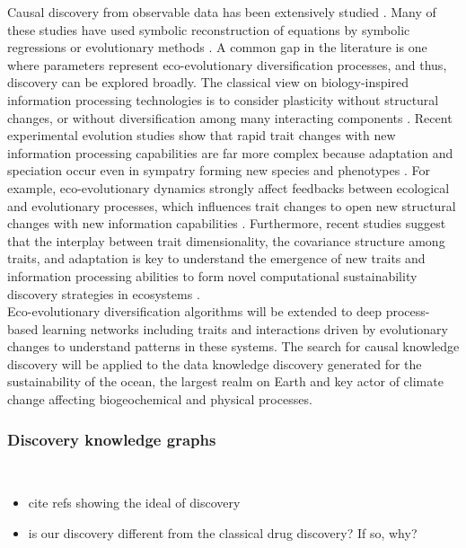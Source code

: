 \documentclass[12pt,a4paper]{article}
\begin{document}
Causal discovery from observable data has been extensively studied \citep{Rackauckas2020}. Many of these studies have used symbolic reconstruction of equations by symbolic regressions or evolutionary methods \citep{Koza1992, quade2016prediction, tanevski2020combinatorial}. A common gap in the literature is one where parameters represent eco-evolutionary diversification processes, and thus, discovery can be explored broadly. The classical view on biology-inspired information processing technologies is to consider plasticity without structural changes, or without diversification among many interacting components \citep{DARWISH2018231}. Recent experimental evolution studies show that rapid trait changes with new information processing capabilities are far more complex because adaptation and speciation occur even in sympatry forming new species and phenotypes \citep{Seehausen2014}. For example, eco-evolutionary dynamics strongly affect feedbacks between ecological and evolutionary processes, which influences trait changes to open new structural changes with new information capabilities \citep{Govaertetal2019}. Furthermore, recent studies suggest that the interplay between trait dimensionality, the covariance structure among traits, and adaptation is key to understand the emergence of new traits and information processing abilities to form novel computational sustainability discovery strategies in ecosystems \cite{zora172044}.\\

Eco-evolutionary diversification algorithms will be extended to deep process-based learning networks including traits and interactions driven by evolutionary changes to understand patterns in these systems. The search for causal knowledge discovery will be applied to the data knowledge discovery generated for the sustainability of the ocean, the largest realm on Earth and key actor of climate change affecting biogeochemical and physical processes. 

\subsubsection{Discovery knowledge graphs}
\\
\begin{itemize}
    \item cite refs showing the ideal of discovery
    \item is our discovery different from the classical drug discovery? If so, why?
\end{itemize}
\end{document}
